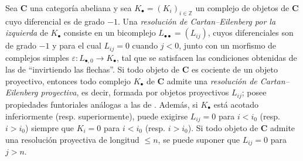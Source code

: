 \begin{env}[11.6.1]
\label{0.11.6.1}
\label{0.11.6.1-fr}
Sea $\boldsymbol{C}$ una categoría abeliana y sea $K_\bullet=(K_i)_{i\in\mathbb Z}$ un complejo de objetos de $\boldsymbol{C}$ cuyo diferencial es de grado $-1$.
Una \emph{resolución de Cartan--Eilenberg por la izquierda} de $K_\bullet$ consiste en un bicomplejo $L_{\bullet\bullet}=(L_{ij})$, cuyos diferenciales son de grado $-1$ y para el cual $L_{ij}=0$ cuando $j<0$, junto con un morfismo de complejos simples
$\varepsilon:L_{\bullet,0}\to K_\bullet$,
tal que se satisfacen las condiciones obtenidas de las de  ``invirtiendo las flechas''.
Si todo objeto de $\boldsymbol{C}$ es cociente de un objeto proyectivo, entonces todo complejo $K_\bullet$ de $\boldsymbol{C}$ admite una \emph{resolución de Cartan--Eilenberg proyectiva}, es decir, formada por objetos proyectivos $L_{ij}$; posee propiedades funtoriales análogas a las de .
Además, si $K_\bullet$ está acotado inferiormente (resp. superiormente), puede exigirse $L_{ij}=0$ para $i<i_0$ (resp. $i>i_0$) siempre que $K_i=0$ para $i<i_0$ (resp. $i>i_0$).
Si todo objeto de $\boldsymbol{C}$ admite una resolución proyectiva de longitud $\leq n$, se puede suponer que $L_{ij}=0$ para $j>n$.
\end{env}

